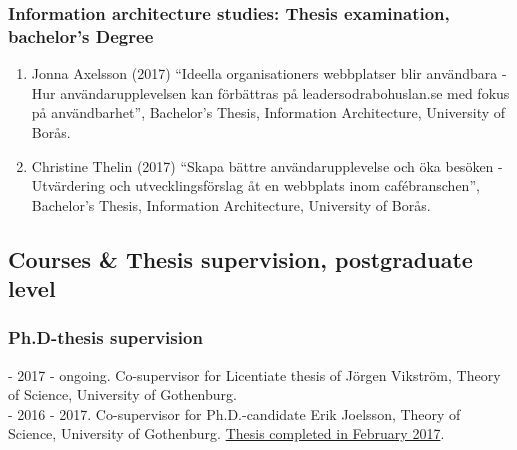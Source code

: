 \documentclass[a4paper,11pt,oneside]{article}
\begin{document}
             \subsubsection{Information architecture studies: Thesis examination, bachelor's Degree}
             \begin{enumerate}
              \item Jonna Axelsson (2017) ``Ideella organisationers webbplatser blir användbara - Hur användarupplevelsen kan förbättras på leadersodrabohuslan.se med fokus på användbarhet'', Bachelor's Thesis, Information Architecture, University of Borås.
              \item Christine Thelin (2017) ``Skapa bättre användarupplevelse och öka besöken - Utvärdering och utvecklingsförslag åt en webbplats inom cafébranschen'', Bachelor's Thesis, Information Architecture, University of Borås.
           \end{enumerate}


    \subsection{Courses \& Thesis supervision, postgraduate level}

    \subsubsection{Ph.D-thesis supervision}
    - 2017 - ongoing. Co-supervisor for Licentiate thesis of Jörgen Vikström, Theory of Science, University of Gothenburg.\\
    - 2016 - 2017. Co-supervisor for Ph.D.-candidate Erik Joelsson, Theory of Science, University of Gothenburg. \href{https://gupea.ub.gu.se/handle/2077/51493}{Thesis completed in February 2017}.
\end{document}

